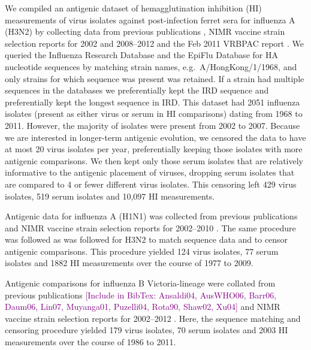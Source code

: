 \documentclass[11pt,oneside,letterpaper]{article}
\def\tbc#1{\textcolor{purple}{[#1]}}
\begin{document}
We compiled an antigenic dataset of hemagglutination inhibition (HI) measurements of virus isolates against post-infection ferret sera for influenza A (H3N2) by collecting data from previous publications \cite{Hay01,Smith04,Russell08,Barr10}, NIMR vaccine strain selection reports for 2002 and 2008--2012 \cite{NIMR02,NIMRMarch08,NIMRFeb09,NIMRFeb10,NIMRSep10,NIMRSep11,NIMRFeb12} and the Feb 2011 VRBPAC report \cite{Cox11FDA}.
We queried the Influenza Research Database \cite{IRD} and the EpiFlu Database \cite{GISAID} for HA nucleotide sequences by matching strain names, e.g.\ A/HongKong/1/1968, and only strains for which sequence was present was retained.
If a strain had multiple sequences in the databases we preferentially kept the IRD sequence and preferentially kept the longest sequence in IRD. 
This dataset had 2051 influenza isolates (present as either virus or serum in HI comparisons) dating from 1968 to 2011. 
However, the majority of isolates were present from 2002 to 2007. 
Because we are interested in longer-term antigenic evolution, we censored the data to have at most 20 virus isolates per year, preferentially keeping those isolates with more antigenic comparisons. 
We then kept only those serum isolates that are relatively informative to the antigenic placement of viruses, dropping serum isolates that are compared to 4 or fewer different virus isolates.
This censoring left 429 virus isolates, 519 serum isolates and 10,097 HI measurements. 

Antigenic data for influenza A (H1N1) was collected from previous publications \cite{Kendal78,Webster79,Nakajima79,Nakajima81,Chakraverty82,Pereira82,Chakraverty86,Cox83,Daniels85,Raymond86,Stevens87,Donatelli93,Hay01,Daum02,McDonald07,Barr10} and NIMR vaccine strain selection reports for 2002--2010 \cite{NIMR02,NIMR03,NIMR04,NIMRFeb05,NIMRSep05,NIMRMarch06,NIMRSep06,NIMRMarch07,NIMRSep07,NIMRMarch08,NIMRSep08,NIMRFeb09,NIMRFeb10}.
The same procedure was followed as was followed for H3N2 to match sequence data and to censor antigenic comparisons.
This procedure yielded 124 virus isolates, 77 serum isolates and 1882 HI measurements over the course of 1977 to 2009.

Antigenic comparisons for influenza B Victoria-lineage were collated from previous publications \cite{Hay01} \tbc{Include in BibTex: Ansaldi04, AusWHO06, Barr06, Daum06, Lin07, Muyanga01, Puzelli04, Rota90, Shaw02, Xu04} and NIMR vaccine strain selection reports for 2002--2012 \cite{NIMR02,NIMR03,NIMR04,NIMRFeb05,NIMRSep05,NIMRMarch06,NIMRSep06,NIMRMarch07,NIMRSep07,NIMRMarch08,NIMRFeb09,NIMRSep09,NIMRFeb10,NIMRSep10,NIMRFeb11,NIMRSep11,NIMRFeb12}.
Here, the sequence matching and censoring procedure yielded 179 virus isolates, 70 serum isolates and 2003 HI measurements over the course of 1986 to 2011.
\end{document}
